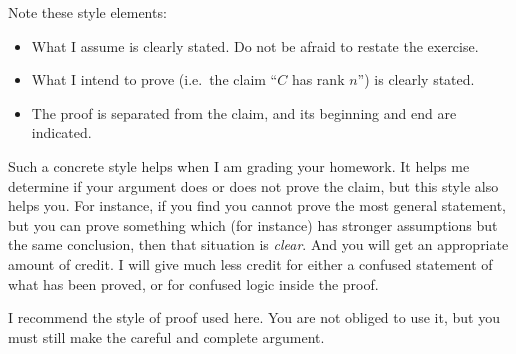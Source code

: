 \documentclass[12pt]{amsart}
\begin{document}
\noindent Note these style elements:
\begin{itemize}
\item What I assume is clearly stated.  Do not be afraid to restate the exercise.
\item What I intend to prove (i.e.~the claim ``$C$ has rank $n$'') is clearly stated.
\item The proof is separated from the claim, and its beginning and end are indicated.
\end{itemize}
\medskip

Such a concrete style helps when I am grading your homework.  It helps me determine if your argument does or does not prove the claim, but this style also helps you.  For instance, if you find you cannot prove the most general statement, but you can prove something which (for instance) has stronger assumptions but the same conclusion, then that situation is \emph{clear}.  And you will get an appropriate amount of credit.  I will give much less credit for either a confused statement of what has been proved, or for confused logic inside the proof.
\medskip

I recommend the style of proof used here.  You are not obliged to use it, but you must still make the careful and complete argument.
\end{document}
